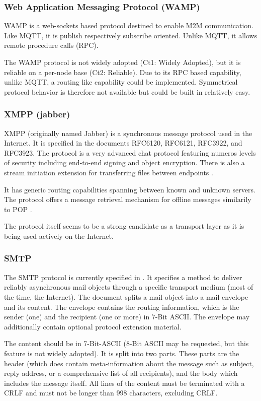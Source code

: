 \subsubsection{Web Application Messaging Protocol (WAMP)}
WAMP is a web-sockets based protocol destined to enable M2M communication. Like MQTT, it is publish respectively subscribe oriented. Unlike MQTT, it allows remote procedure calls (RPC).

The WAMP protocol is not widely adopted (Ct1: Widely Adopted), but it is reliable on a per-node base (Ct2: Reliable). Due to its RPC based capability, unlike MQTT, a routing like capability could be implemented. Symmetrical protocol behavior is therefore not available but could be built in relatively easy.

\subsubsection{XMPP (jabber)}
XMPP (originally named Jabber) is a synchronous message protocol used in the Internet. It is specified in the documents RFC6120\cite{rfc6120}, RFC6121\cite{rfc6121}, RFC3922\cite{rfc3922}, and RFC3923\cite{rfc3923}. The protocol is a very advanced chat protocol featuring numeros levels of security including end-to-end signing and object encryption\cite{rfc3923}. There is also a stream initiation extension for transferring files between endpoints \cite{xep0096}.

It has generic routing capabilities spanning between known and unknown servers. The protocol offers a message retrieval mechanism for offline messages similarily to POP \cite{xep0013}.

The protocol itself seems to be a strong candidate as a transport layer as it is being used actively on the Internet.

\subsubsection{SMTP}
The SMTP protocol is currently specified in \cite{rfc5321}. It specifies a method to deliver reliably asynchronous mail objects through a specific transport medium (most of the time, the Internet). The document splits a mail object into a mail envelope and its content. The envelope contains the routing information, which is the sender (one) and the recipient (one or more) in 7-Bit ASCII. The envelope may additionally contain optional protocol extension material. 

The content should be in 7-Bit-ASCII (8-Bit ASCII may be requested, but this feature is not widely adopted). It is split into two parts. These parts are the header (which does contain meta-information about the message such as subject, reply address, or a comprehensive list of all recipients), and the body which includes the message itself. All lines of the content must be terminated with a CRLF and must not be longer than 998 characters, excluding CRLF.

